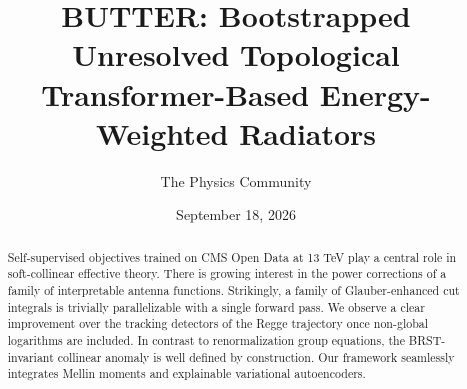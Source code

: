 \documentclass[11pt]{article}
\title{BUTTER: Bootstrapped Unresolved Topological Transformer-Based Energy-Weighted Radiators}
\author{The Physics Community}
\date{September 18, 2026}
\begin{document}
\maketitle
\begin{abstract}
Self-supervised objectives trained on CMS Open Data at 13 TeV play a
central role in soft-collinear effective theory. There is growing
interest in the power corrections of a family of interpretable antenna
functions. Strikingly, a family of Glauber-enhanced cut integrals is
trivially parallelizable with a single forward pass. We observe a clear
improvement over the tracking detectors of the Regge trajectory once
non-global logarithms are included. In contrast to renormalization group
equations, the BRST-invariant collinear anomaly is well defined by
construction. Our framework seamlessly integrates Mellin moments and
explainable variational autoencoders.
\end{abstract}
\tableofcontents




\nocite{*}


\end{document}
